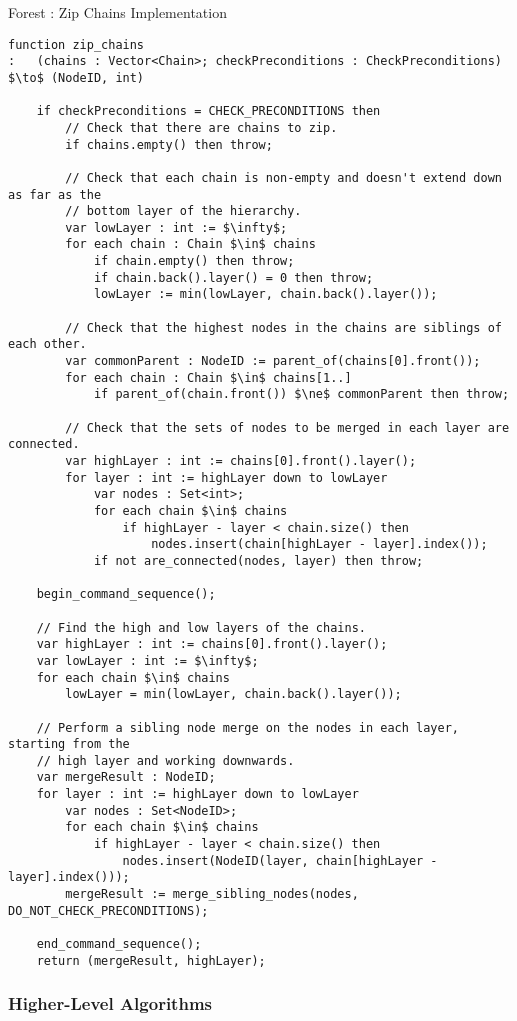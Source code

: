 \begin{stulisting}[p]
\caption{Forest : Zip Chains Implementation}
\label{code:ipfs-forest-zipchains}
\begin{lstlisting}[style=Default]
function zip_chains
:	(chains : Vector<Chain>; checkPreconditions : CheckPreconditions) $\to$ (NodeID, int)

	if checkPreconditions = CHECK_PRECONDITIONS then
		// Check that there are chains to zip.
		if chains.empty() then throw;

		// Check that each chain is non-empty and doesn't extend down as far as the
		// bottom layer of the hierarchy.
		var lowLayer : int := $\infty$;
		for each chain : Chain $\in$ chains
			if chain.empty() then throw;
			if chain.back().layer() = 0 then throw;
			lowLayer := min(lowLayer, chain.back().layer());

		// Check that the highest nodes in the chains are siblings of each other.
		var commonParent : NodeID := parent_of(chains[0].front());
		for each chain : Chain $\in$ chains[1..]
			if parent_of(chain.front()) $\ne$ commonParent then throw;

		// Check that the sets of nodes to be merged in each layer are connected.
		var highLayer : int := chains[0].front().layer();
		for layer : int := highLayer down to lowLayer
			var nodes : Set<int>;
			for each chain $\in$ chains
				if highLayer - layer < chain.size() then
					nodes.insert(chain[highLayer - layer].index());
			if not are_connected(nodes, layer) then throw;

	begin_command_sequence();

	// Find the high and low layers of the chains.
	var highLayer : int := chains[0].front().layer();
	var lowLayer : int := $\infty$;
	for each chain $\in$ chains
		lowLayer = min(lowLayer, chain.back().layer());

	// Perform a sibling node merge on the nodes in each layer, starting from the
	// high layer and working downwards.
	var mergeResult : NodeID;
	for layer : int := highLayer down to lowLayer
		var nodes : Set<NodeID>;
		for each chain $\in$ chains
			if highLayer - layer < chain.size() then
				nodes.insert(NodeID(layer, chain[highLayer - layer].index()));
		mergeResult := merge_sibling_nodes(nodes, DO_NOT_CHECK_PRECONDITIONS);

	end_command_sequence();
	return (mergeResult, highLayer);
\end{lstlisting}
\end{stulisting}

\subsubsection{Higher-Level Algorithms}

